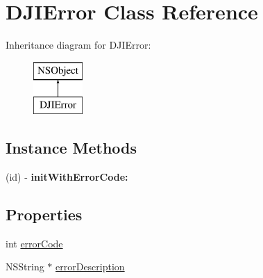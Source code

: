 \hypertarget{interface_d_j_i_error}{\section{D\+J\+I\+Error Class Reference}
\label{interface_d_j_i_error}
}
Inheritance diagram for D\+J\+I\+Error\+:\begin{figure}[H]
\begin{center}
\leavevmode
\includegraphics[height=2.000000cm]{interface_d_j_i_error}
\end{center}
\end{figure}
\subsection*{Instance Methods}
\begin{DoxyCompactItemize}
\item 
\hypertarget{interface_d_j_i_error_af4ede61e5a89677364d5225d88880c4a}{(id) -\/ {\bfseries init\+With\+Error\+Code\+:}}\label{interface_d_j_i_error_af4ede61e5a89677364d5225d88880c4a}

\end{DoxyCompactItemize}
\subsection*{Properties}
\begin{DoxyCompactItemize}
\item 
int \hyperlink{interface_d_j_i_error_a92c9fa51ec6acea8d7dad2dd46346372}{error\+Code}
\item 
N\+S\+String $\ast$ \hyperlink{interface_d_j_i_error_a6f210d906aad9322560db1abec9e2e51}{error\+Description}
\end{DoxyCompactItemize}


